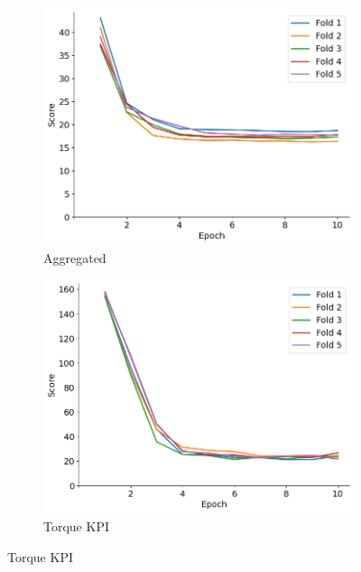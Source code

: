 \documentclass{report} %
\begin{document}
\begin{figure}[H]
    \centering
    \begin{subfigure}{0.32\textwidth}
        \centering
        \includegraphics[width=\textwidth]{./ReportImages/train_score.png}
        \caption{\centering Aggregated}
        \label{fig:Aggregated Training Score}
    \end{subfigure}\hfill
    \begin{subfigure}{0.32\textwidth}
        \centering
        \includegraphics[width=\textwidth]{./ReportImages/train_score_y1.png}
        \caption{\centering Torque \ac{KPI}}
        \label{fig:Training Score for Torque Curve}
    \end{subfigure}\hfill

\end{figure}
\end{document}
